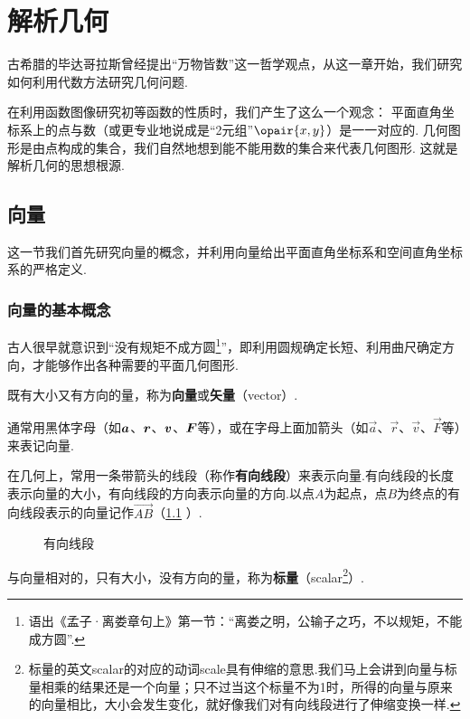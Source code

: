 \chapter{解析几何}
古希腊的毕达哥拉斯曾经提出“万物皆数”这一哲学观点，从这一章开始，我们研究如何利用代数方法研究几何问题.

在利用函数图像研究初等函数的性质时，我们产生了这么一个观念：
平面直角坐标系上的点与数（或更专业地说成是“2元组”\(\opair{x,y}\)）是一一对应的.
几何图形是由点构成的集合，我们自然地想到能不能用数的集合来代表几何图形.
这就是解析几何的思想根源.

\section{向量}
这一节我们首先研究向量的概念，并利用向量给出平面直角坐标系和空间直角坐标系的严格定义.

\subsection{向量的基本概念}
古人很早就意识到“没有规矩不成方圆\footnote{语出《孟子·离娄章句上》第一节：“离娄之明，公输子之巧，不以规矩，不能成方圆”.}”，即利用圆规确定长短、利用曲尺确定方向，才能够作出各种需要的平面几何图形.

\begin{definition}
既有大小又有方向的量，称为\textbf{向量}或\textbf{矢量}（vector）.

通常用黑体字母（如\(\boldsymbol{a}\)、\(\boldsymbol{r}\)、\(\boldsymbol{v}\)、\(\boldsymbol{F}\)等），或在字母上面加箭头（如\(\vec{a}\)、\(\vec{r}\)、\(\vec{v}\)、\(\vec{F}\)等）来表记向量.

在几何上，常用一条带箭头的线段（称作\textbf{有向线段}）来表示向量.有向线段的长度表示向量的大小，有向线段的方向表示向量的方向.以点\(A\)为起点，点\(B\)为终点的有向线段表示的向量记作\(\vec{AB}\)（\cref{figure:解析几何.有向线段} ）.

\begin{figure}[ht]
\centering
{}
\caption{有向线段}
\label{figure:解析几何.有向线段}
\end{figure}

与向量相对的，只有大小，没有方向的量，称为\textbf{标量}（scalar\footnote{标量的英文scalar的对应的动词scale具有伸缩的意思.我们马上会讲到向量与标量相乘的结果还是一个向量；只不过当这个标量不为1时，所得的向量与原来的向量相比，大小会发生变化，就好像我们对有向线段进行了伸缩变换一样.}）.
\end{definition}

